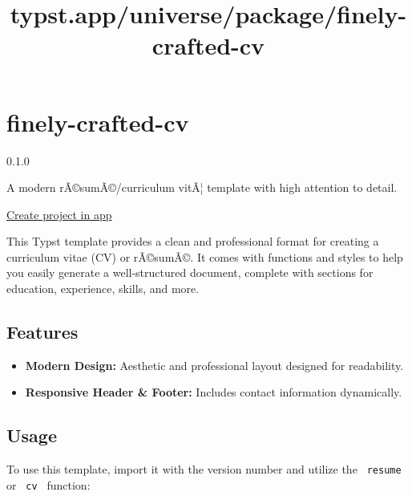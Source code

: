 \title{typst.app/universe/package/finely-crafted-cv}

\label{banner}
\label{template-thumbnail}

\section{finely-crafted-cv}\label{finely-crafted-cv}

{ 0.1.0 }

A modern rÃ©sumÃ©/curriculum vitÃ¦ template with high attention to
detail.

\href{/app?template=finely-crafted-cv&version=0.1.0}{Create project in
app}

\label{readme}
This Typst template provides a clean and professional format for
creating a curriculum vitae (CV) or rÃ©sumÃ©. It comes with functions
and styles to help you easily generate a well-structured document,
complete with sections for education, experience, skills, and more.

\subsection{Features}\label{features}

\begin{itemize}
\tightlist
\item
  \textbf{Modern Design:} Aesthetic and professional layout designed for
  readability.
\item
  \textbf{Responsive Header \& Footer:} Includes contact information
  dynamically.
\end{itemize}

\subsection{Usage}\label{usage}

To use this template, import it with the version number and utilize the
\texttt{\ resume\ } or \texttt{\ cv\ } function:

